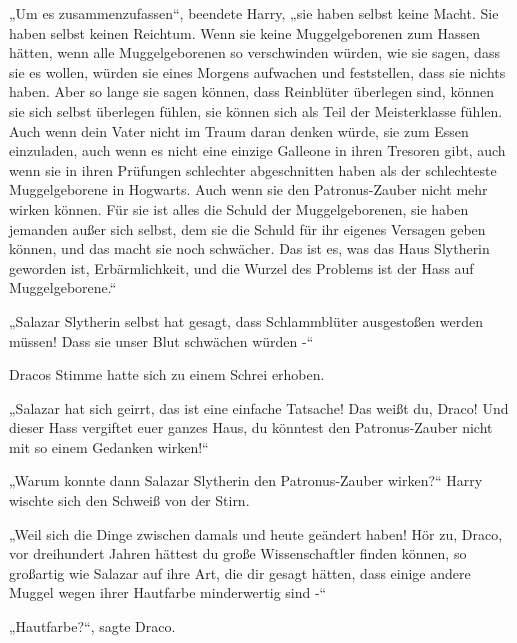 {„Um es zusammenzufassen“, beendete Harry, „sie haben selbst keine Macht. Sie haben selbst keinen Reichtum. Wenn sie keine Muggelgeborenen zum Hassen hätten, wenn alle Muggelgeborenen so verschwinden würden, wie sie sagen, dass sie es wollen, würden sie eines Morgens aufwachen und feststellen, dass sie nichts haben. Aber so lange sie sagen können, dass Reinblüter überlegen sind, können sie sich selbst überlegen fühlen, sie können sich als Teil der Meisterklasse fühlen. Auch wenn dein Vater nicht im Traum daran denken würde, sie zum Essen einzuladen, auch wenn es nicht eine einzige Galleone in ihren Tresoren gibt, auch wenn sie in ihren Prüfungen schlechter abgeschnitten haben als der schlechteste Muggelgeborene in Hogwarts. Auch wenn sie den Patronus-Zauber nicht mehr wirken können. Für sie ist alles die Schuld der Muggelgeborenen, sie haben jemanden außer sich selbst, dem sie die Schuld für ihr eigenes Versagen geben können, und das macht sie noch schwächer. Das ist es, was das Haus Slytherin geworden ist, Erbärmlichkeit, und die Wurzel des Problems ist der Hass auf Muggelgeborene.“

„Salazar Slytherin selbst hat gesagt, dass Schlammblüter ausgestoßen werden müssen! Dass sie unser Blut schwächen würden -“

Dracos Stimme hatte sich zu einem Schrei erhoben.

„Salazar hat sich geirrt, das ist eine einfache Tatsache! Das weißt du, Draco! Und dieser Hass vergiftet euer ganzes Haus, du könntest den Patronus-Zauber nicht mit so einem Gedanken wirken!“

„Warum konnte dann Salazar Slytherin den Patronus-Zauber wirken?“ Harry wischte sich den Schweiß von der Stirn.

„Weil sich die Dinge zwischen damals und heute geändert haben! Hör zu, Draco, vor dreihundert Jahren hättest du große Wissenschaftler finden können, so großartig wie Salazar auf ihre Art, die dir gesagt hätten, dass einige andere Muggel wegen ihrer Hautfarbe minderwertig sind -“

„Hautfarbe?“, sagte Draco.

}
